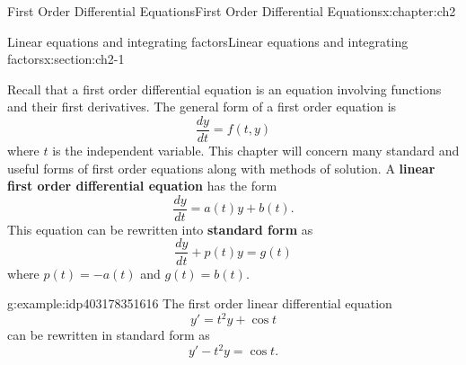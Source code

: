 \documentclass[oneside,10pt,]{book}
\newcommand{\terminology}[1]{\textbf{#1}}
\numberwithin{equation}{section}
\numberwithin{equation}{section}
\begin{document}
\begin{chapterptx}{First Order Differential Equations}{}{First Order Differential Equations}{}{}{x:chapter:ch2}
%
%
\typeout{************************************************}
\typeout{************************************************}
%
\begin{sectionptx}{Linear equations and integrating factors}{}{Linear equations and integrating factors}{}{}{x:section:ch2-1}
\begin{introduction}{}%
Recall that a first order differential equation is an equation involving functions and their first derivatives. The general form of a first order equation is%
\begin{equation*}
\frac{dy}{dt} = f(t, y)
\end{equation*}
where \(t\) is the independent variable. This chapter will concern many standard and useful forms of first order equations along with methods of solution. A \terminology{linear first order differential equation} has the form%
\begin{equation*}
\frac{dy}{dt} = a(t) y + b(t).
\end{equation*}
This equation can be rewritten into \terminology{standard form} as%
\begin{equation*}
\frac{dy}{dt} + p(t) y = g(t)
\end{equation*}
where \(p(t) = -a(t)\) and \(g(t) = b(t)\).%
\begin{example}{}{g:example:idp403178351616}%
The first order linear differential equation%
\begin{equation*}
y' = t^2 y + \cos t
\end{equation*}
can be rewritten in standard form as%
\begin{equation*}
y' - t^2 y = \cos t.
\end{equation*}
%
\end{example}
\end{introduction}%
%
%
\typeout{************************************************}
\typeout{************************************************}
%
\end{sectionptx}
\end{chapterptx}
\end{document}
